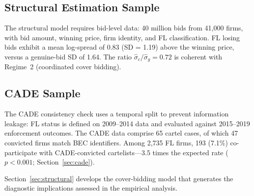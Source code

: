 

\subsection{Structural Estimation Sample}
\label{sec:structural_sample}

The structural model requires bid-level data: 40 million bids from
41,000 firms, with bid amount, winning price, firm identity, and FL
classification. FL losing bids exhibit a mean log-spread of 0.83
(SD = 1.19) above the winning price, versus a genuine-bid SD of 1.64.
The ratio $\hat{\sigma}_c / \hat{\sigma}_g = 0.72$ is coherent with Regime~2
(coordinated cover bidding).

\subsection{CADE Sample}
\label{sec:cade_sample}

The CADE consistency check uses a temporal split to prevent information
leakage: FL status is defined on 2009--2014 data and evaluated against
2015--2019 enforcement outcomes. The CADE data comprise 65 cartel
cases, of which 47 convicted firms match BEC identifiers. Among 2,735
FL firms, 193 (7.1\%) co-participate with CADE-convicted
cartelists---3.5 times the expected rate ($p < 0.001$;
Section~\ref{sec:cade}).

Section~\ref{sec:structural} develops the cover-bidding model that
generates the diagnostic implications assessed in the empirical
analysis.
